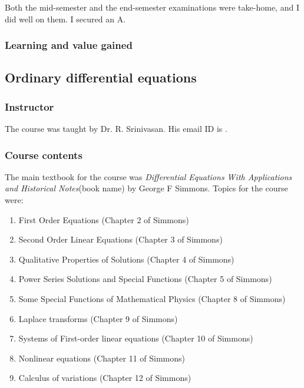 \documentclass[a4paper]{amsart}
\newcommand{\bookname}[1]{{\em #1}{\small{(book name)}}}
\begin{document}
Both the mid-semester and the end-semester examinations were take-home,
and I did well on them. I secured an A.

\subsubsection{Learning and value gained}

\subsection{Ordinary differential equations}

\subsubsection{Instructor}

The course was taught by Dr. R. Srinivasan. His email ID is .

\subsubsection{Course contents}

The main textbook for the course was \bookname{Differential Equations With Applications and Historical Notes} by George F Simmons.
Topics for the course were:

\begin{enumerate}

\item First Order Equations (Chapter 2 of Simmons)

\item Second Order Linear Equations (Chapter 3 of Simmons)

\item Qualitative Properties of Solutions (Chapter 4 of Simmons)

\item Power Series Solutions and Special Functions (Chapter 5 of Simmons)

\item Some Special Functions of Mathematical Physics (Chapter 8 of Simmons)

\item Laplace transforms (Chapter 9 of Simmons)

\item Systems of First-order linear equations (Chapter 10 of Simmons)

\item Nonlinear equations (Chapter 11 of Simmons)

\item Calculus of variations (Chapter 12 of Simmons)

\end{enumerate}
\end{document}
